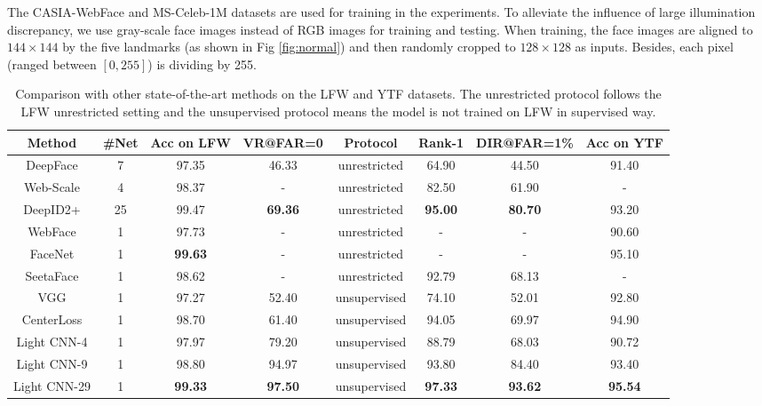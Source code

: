 \documentclass[journal,transmag]{IEEEtran}
\begin{document}
The CASIA-WebFace and MS-Celeb-1M datasets are used for training in the experiments. To alleviate the influence of large illumination discrepancy, we use gray-scale face images instead of RGB images for training and testing. When training, the face images are aligned to $144\times 144$ by the five landmarks \cite{sun2013deep} (as shown in Fig \ref{fig:normal}) and then randomly cropped to $128\times 128$ as inputs. Besides, each pixel (ranged between $[0, 255]$) is dividing by 255.

\begin{table*}[t]
\centering
\caption{Comparison with other state-of-the-art methods on the LFW and YTF datasets. The unrestricted protocol follows the LFW unrestricted setting and the unsupervised protocol means the model is not trained on LFW in supervised way.}
\begin{tabular}{|c|c|c|c|c|c|c|c|}
\hline
Method & \#Net & Acc on LFW & VR@FAR=0 & Protocol & Rank-1 & DIR@FAR=1\% & Acc on YTF\\
\hline
\hline
DeepFace \cite{taigman2014deepface} & 7 & 97.35 & 46.33 & unrestricted & 64.90 & 44.50 & 91.40\\
Web-Scale \cite{taigman2014web} & 4 & 98.37 & - & unrestricted & 82.50 & 61.90 & - \\
DeepID2+ \cite{DBLP:conf/cvpr/SunWT15}  & 25 & 99.47 &  \textbf{69.36} & unrestricted & \textbf{95.00} & \textbf{80.70} & 93.20\\
WebFace \cite{yi2014learning} & 1 & 97.73 & - & unrestricted & - & - & 90.60\\
FaceNet \cite{schroff2015facenet} & 1 & \textbf{99.63} & - & unrestricted & - & -& 95.10\\
SeetaFace \cite{liu2016viplfacenet} & 1 & 98.62 & -  & unrestricted &  92.79 & 68.13 & - \\
\hline
\hline
VGG \cite{parkhi2015deep} & 1 & 97.27 & 52.40 & unsupervised & 74.10 & 52.01 & 92.80\\
CenterLoss \cite{wen2016discriminative} & 1 & 98.70 & 61.40  & unsupervised & 94.05 & 69.97 & 94.90\\
Light CNN-4  & 1 & 97.97 & 79.20 & unsupervised & 88.79 & 68.03 & 90.72\\
Light CNN-9  & 1 & 98.80 & 94.97 & unsupervised & 93.80 & 84.40 & 93.40\\
Light CNN-29 & 1 & \textbf{99.33} & \textbf{97.50} & unsupervised & \textbf{97.33} & \textbf{93.62} & \textbf{95.54}\\
\hline
\end{tabular}
\label{tab:result}
\end{table*}
\end{document}
